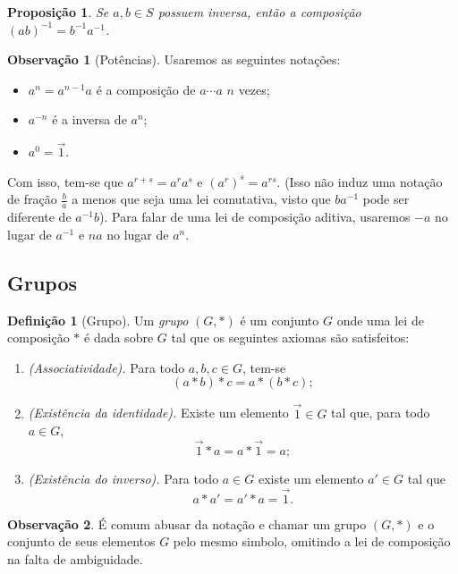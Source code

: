 \documentclass[a4paper,12pt]{report}
\theoremstyle{plain}
\newtheorem{proposicao}{Proposição}[section]
\theoremstyle{definition}
\newtheorem{definicao}{Definição}[section]
\newtheorem{observacao}{Observação}[section]
\begin{document}
	
	\begin{proposicao}
		Se \(a,b\in S\) possuem inversa, então a composição \((ab)^{-1} = b^{-1}a^{-1}\).
	\end{proposicao}
	
	\begin{observacao}[Potências]
		Usaremos as seguintes notações:
		\begin{itemize}
			\item \(a^n = a^{n-1}a\) é a composição de \(a\dotsb a\) \(n\) vezes;
			\item \(a^{-n}\) é a inversa de \(a^n\);
			\item \(a^0 = \vec{1}\).
		\end{itemize}
	
		Com isso, tem-se que \(a^{r+s} = a^ra^s\) e \((a^r)^s = a^{rs}\). (Isso
		não induz uma notação de fração \(\frac{b}{a}\) a menos que seja uma lei
		comutativa, visto que \(ba^{-1}\) pode ser diferente de \(a^{-1}b\)).
		Para falar de uma lei de composição aditiva, usaremos \(-a\) no lugar de
		\(a^{-1}\) e \(na\) no lugar de \(a^n\).
	\end{observacao}
	
	\subsection{Grupos}
	
	\begin{definicao}[Grupo]
		
		Um \emph{grupo} $(G,*)$ é um conjunto \(G\) onde uma lei de
		composição $*$ é dada sobre \(G\) tal que os seguintes axiomas são satisfeitos:
		
		\begin{enumerate}
			\item \emph{(Associatividade).} Para todo $a,b,c \in G$, tem-se $$(a*b)*c = a*(b*c);$$
			\item \emph{(Existência da identidade).} Existe um elemento $\vec{1}\in G$ tal que, para todo $a\in G$, $$\vec{1}*a = a*\vec{1} = a;$$
			\item \emph{(Existência do inverso).} Para todo $a\in G$ existe um elemento $a'\in G$ tal que $$a*a' = a'*a = \vec{1}.$$
		\end{enumerate}
	\end{definicao}
	
	\begin{observacao}
		É comum abusar da notação e chamar um grupo $(G,*)$ e o conjunto de	seus elementos $G$ pelo mesmo simbolo, omitindo a lei de composição na falta de ambiguidade.	
	\end{observacao}
	
\end{document}
